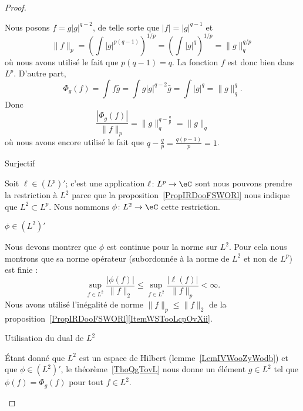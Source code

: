 \begin{proof}
\begin{subproof}
            Nous posons \( f=g| g |^{q-2}\), de telle sorte que \( | f |=| g |^{q-1}\) et
            \begin{equation}
                \| f \|_p=\left( \int| g |^{p(q-1)} \right)^{1/p}=\left( \int | g |^q \right)^{1/p}=\| g \|_q^{q/p}
            \end{equation}
            où nous avons utilisé le fait que \( p(q-1)=q\). La fonction \( f\) est donc bien dans \( L^p\). D'autre part,
            \begin{equation}
                \Phi_g(f)=\int f\bar g=\int g| g |^{q-2}\bar g=\int | g |^q=\| g \|_q^q.
            \end{equation}
            Donc
            \begin{equation}
                \frac{ | \Phi_g(f) | }{ \| f \|_p }=\| g \|_q^{q-\frac{ q }{ p }}=\| g \|_q
            \end{equation}
            où nous avons encore utilisé le fait que \( q-\frac{ q }{ p }=\frac{ q(p-1) }{ p }=1\).

        \item[Surjectif]

            Soit \( \ell\in (L^p)'\); c'est une application \( \ell\colon L^p\to \eC\) sont nous pouvons prendre la restriction à \( L^2\) parce que la proposition~\ref{PropIRDooFSWORl} nous indique que \( L^2\subset L^p\). Nous nommons \( \phi\colon L^2\to \eC\) cette restriction.

            \begin{subproof}

                \item[\( \phi\in (L^2)'\)]

                    Nous devons montrer que \( \phi\) est continue pour la norme sur \( L^2\). Pour cela nous montrons que sa norme opérateur (subordonnée à la norme de \( L^2\) et non de \( L^p\)) est finie :
                    \begin{equation}
                        \sup_{f\in L^2}\frac{ | \phi(f) | }{ \| f \|_{2} }\leq \sup_{f\in L^2}\frac{ | \ell(f) | }{ \| f \|_p }<\infty.
                    \end{equation}
                    Nous avons utilisé l'inégalité de norme \( \| f \|_p\leq \| f \|_2\) de la proposition~\ref{PropIRDooFSWORl}\ref{ItemWSTooLcpOvXii}.

                \item[Utilisation du dual de \( L^2\)]

                    Étant donné que \( L^2\) est un espace de Hilbert (lemme~\ref{LemIVWooZyWodb}) et que \( \phi\in (L^2)'\), le théorème~\ref{ThoQgTovL} nous donne un élément \( g\in L^2\) tel que \( \phi(f)=\Phi_g(f)\) pour tout \( f\in L^2\).


\end{subproof}
\end{subproof}
\end{proof}
